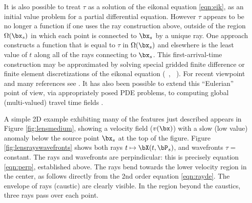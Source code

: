 It is also possible to treat $\tau$ as a solution of the eikonal
equation \ref{eqn:eik}, as an initial value problem for a partial
differential equation. However $\tau$ appears to be no longer a
function if one uses the ray construction above, outside of the region
$\Omega(\bx_s)$ in which each point is connected to $\bx_s$ by a
unique ray. One approach constructs a function that is equal to $\tau$
in $\Omega(\bx_s)$ and elsewhere is the least value of $t$ along all
of the rays connecting to $\bx_s$. This first-arrival-time
construction may be approximated by solving special gridded finite difference or
finite element discretizations of the eikonal equation (~\cite{Vid:88}, 
~\cite{VantrSy:90}). For recent viewpoint and many references see
\cite[]{LuoQianBurridge:14}. It has also been possible to extend this
``Eulerian'' point of view, via appropriately posed PDE problems, to
computing global (multi-valued) travel time fields
\cite[]{FomelSethian:02,QianChengOsher:03}.

A simple 2D example exhibiting many of the features just described
appears in Figure \ref{fig:lensmedium}, showing a velocity field ($v(\bx)$)
with a slow (low value) anomaly below the source point $\bx_s$ at the
top of the figure. Figure \ref{fig:lensrayswavefronts} shows both rays
$t \mapsto \bX(t,\bP_s)$, and wavefronts $\tau=$ constant. The rays
and wavefronts are perpindicular: this is precisely equation
\ref{eqn:perp}, established above. The rays bend towards the lower
velocity region in the center, as follows directly from the 2nd order
equation \ref{eqn:rayde}. The envelope of rays (caustic) are clearly
visible. In the region beyond the caustics, three rays pass over each point.


